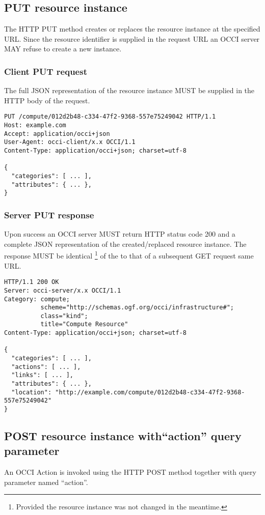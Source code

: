 \documentclass[10pt,a4paper]{article}
\begin{document}
\subsection{PUT resource instance}
The HTTP PUT method creates or replaces the resource instance at the specified
URL. Since the resource identifier is supplied in the request URL an OCCI
server MAY refuse to create a new instance.

\subsubsection{Client PUT request}
The full JSON representation of the resource instance MUST be supplied in the
HTTP body of the request.


\begin{verbatim}
PUT /compute/012d2b48-c334-47f2-9368-557e75249042 HTTP/1.1
Host: example.com
Accept: application/occi+json
User-Agent: occi-client/x.x OCCI/1.1
Content-Type: application/occi+json; charset=utf-8

{
  "categories": [ ... ],
  "attributes": { ... },
}
\end{verbatim}

\subsubsection{Server PUT response}
Upon success an OCCI server MUST return HTTP status code 200 and a complete
JSON representation of the created/replaced resource instance. The response MUST
be identical%
\footnote{Provided the resource instance was not changed in the meantime.} of the
to that of a subsequent GET request same URL.

\begin{verbatim}
HTTP/1.1 200 OK
Server: occi-server/x.x OCCI/1.1
Category: compute;
          scheme="http://schemas.ogf.org/occi/infrastructure#";
          class="kind";
          title="Compute Resource"
Content-Type: application/occi+json; charset=utf-8

{
  "categories": [ ... ],
  "actions": [ ... ],
  "links": [ ... ],
  "attributes": { ... },
  "location": "http://example.com/compute/012d2b48-c334-47f2-9368-557e75249042"
}
\end{verbatim}

\subsection{POST resource instance with``action'' query parameter}
An OCCI Action is invoked using the HTTP POST method together with query
parameter named ``action''.
\end{document}
